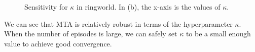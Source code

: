 \documentclass{article}
\begin{document}
\begin{figure}
\centering
{}
\hfill
{}

\caption{\small Sensitivity for $\kappa$ in ringworld. In (b), the x-axis is the values of $\kappa$.}
\label{fig:ringworld_sensitivity}
\end{figure}
\par
We can see that MTA is relatively robust in terms of the hyperparameter $\kappa$. When the number of episodes is large, we can safely set $\kappa$ to be a small enough value to achieve good convergence.
\end{document}
